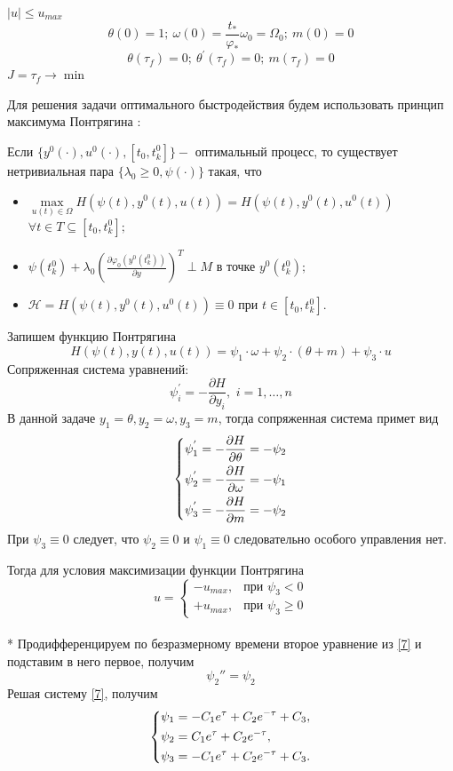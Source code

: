 \documentclass[a4paper,14pt]{article}
\theoremstyle{plain} %
\theoremstyle{definition} %
\theoremstyle{remark} %
\begin{document}
{$|u|\leqslant u_{max}$
\[
    \theta(0)=1;\ \omega(0)=\frac{t_\ast}{\varphi_\ast}\omega_0=\Omega_0;\ m(0)=0
\]
\[
    \theta(\tau_f)=0;\ \theta^{'}(\tau_f)=0;\ m(\tau_f)=0
\]
$J=\tau_f\to \min$

Для решения задачи оптимального быстродействия будем использовать принцип максимума Понтрягина \cite{Optimal}:

Если $\{y^0(\cdot),u^0(\cdot),[t_0,t_k^0]\} - $ оптимальный процесс, то существует нетривиальная пара $\{\lambda_0\geq0,\psi(\cdot)\}$
такая, что
\begin{itemize}
    \item $ \mathop {\max }\limits_{u(t) \in \Omega}  H(\psi(t),y^0(t),u(t))=H(\psi(t),y^0(t),u^0(t))$
          $\forall t \in T \subseteq [t_0,t_k^0];$
    \item $\psi(t_k^0)+\lambda_0(\frac{\partial \varphi_0(y^0(t_k^0))}{\partial y})^T \perp M \text{ в точке } y^0(t_k^0);$
    \item $\mathcal{H}=H(\psi(t),y^0(t),u^0(t))\equiv0 \text{ при } t \in [t_0,t_k^0].$
\end{itemize}
Запишем функцию Понтрягина
\[
    H(\psi(t),y(t),u(t))=\psi_1\cdot\omega+\psi_2\cdot(\theta+m)+\psi_3\cdot u
\]
Сопряженная система уравнений:
\[
    \psi^{'}_i  =  - \frac{{\partial H}}{{\partial y_i }},\,\,i = 1, \ldots ,n
\]
В данной задаче $y_1 = \theta, y_2 = \omega, y_3=m$, тогда сопряженная система примет вид
\begin{equation} \label{7}
    \left\{ {\begin{aligned}
                 & \psi^{'}_1=  - \frac{{\partial H}}{{\partial \theta}} = - \psi_2\hfill  \\
                 & \psi^{'}_2=  - \frac{{\partial H}}{{\partial \omega }} = - \psi_1\hfill \\
                 & \psi^{'}_3=  - \frac{{\partial H}}{{\partial m }} = - \psi_2 \hfill     \\
            \end{aligned}} \right.
\end{equation}
При $\psi_3\equiv0$ следует, что $\psi_2\equiv0$ и $\psi_1\equiv0$ следовательно особого управления нет.

Тогда для условия максимизации функции Понтрягина
\[
    u=
    \begin{cases}
        -u_{max}, & \text{при $\psi_3<0$}          \\
        +u_{max}, & \text{при $\psi_3\geqslant 0$}
    \end{cases}
\]\\*
Продифференцируем по безразмерному времени второе уравнение из \eqref{7} и подставим в него первое, получим
\[
    \psi_2 ''=\psi_2
\]
Решая систему \eqref{7}, получим
\[
    \left\{ {\begin{aligned}
                 & \psi_1 = -C_1e^\tau+C_2e^{-\tau}+C_3, \hfill  \\
                 & \psi_2 = C_1e^\tau+C_2e^{-\tau} , \hfill      \\
                 & \psi_3 = -C_1e^\tau+C_2e^{-\tau}+C_3 . \hfill \\
            \end{aligned}} \right.
\]

}
\end{document}
